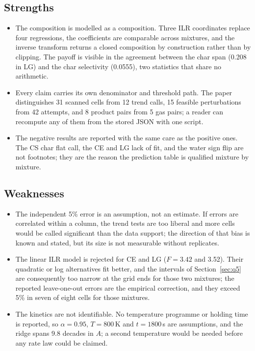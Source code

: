 \documentclass[withoutpreface,bwprint]{apmcmthesis}
\begin{document}
\subsection{Strengths}
\begin{itemize}
\item The composition is modelled as a composition. Three ILR coordinates replace four regressions, the coefficients are comparable across mixtures, and the inverse transform returns a closed composition by construction rather than by clipping. The payoff is visible in the agreement between the char span (0.208 in LG) and the char selectivity (0.0555), two statistics that share no arithmetic.
\item Every claim carries its own denominator and threshold path. The paper distinguishes 31 scanned cells from 12 trend calls, 15 feasible perturbations from 42 attempts, and 8 product pairs from 5 gas pairs; a reader can recompute any of them from the stored JSON with one script.
\item The negative results are reported with the same care as the positive ones. The CS char flat call, the CE and LG lack of fit, and the water sign flip are not footnotes; they are the reason the prediction table is qualified mixture by mixture.
\end{itemize}

\subsection{Weaknesses}
\begin{itemize}
\item The independent 5\% error is an assumption, not an estimate. If errors are correlated within a column, the trend tests are too liberal and more cells would be called significant than the data support; the direction of that bias is known and stated, but its size is not measurable without replicates.
\item The linear ILR model is rejected for CE and LG ($F=3.42$ and 3.52). Their quadratic or log alternatives fit better, and the intervals of Section~\ref{sec:q5} are consequently too narrow at the grid ends for those two mixtures; the reported leave-one-out errors are the empirical correction, and they exceed 5\% in seven of eight cells for those mixtures.
\item The kinetics are not identifiable. No temperature programme or holding time is reported, so $\alpha=0.95$, $T=800$\,K and $t=1800$\,s are assumptions, and the ridge spans 9.8 decades in $A$; a second temperature would be needed before any rate law could be claimed.
\end{itemize}
\end{document}
